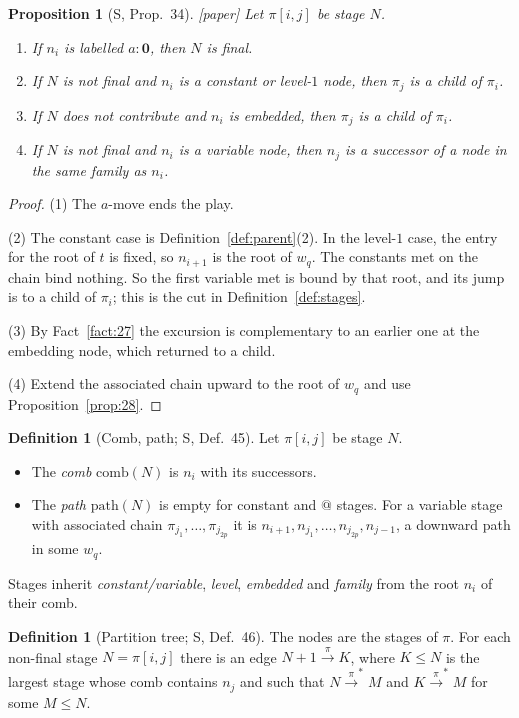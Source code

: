 \documentclass[11pt]{article}
\newcommand{\Ground}{\mathbf{0}}
\newcommand{\iv}[2]{\pi[#1,#2]}
\newcommand{\comb}{\mathrm{comb}}
\newcommand{\pth}{\mathrm{path}}
\newcommand{\ra}[1]{\xrightarrow{#1}}
\newcommand{\Paper}{\textsf{[paper]}}
\theoremstyle{plain}
\newtheorem{proposition}[theorem]{Proposition}
\theoremstyle{definition}
\newtheorem{definition}[theorem]{Definition}
\theoremstyle{remark}
\begin{document}
\begin{proposition}[S, Prop.~34]\label{prop:34}
\Paper{} Let $\iv ij$ be stage $N$.
\begin{enumerate}
\item If $n_i$ is labelled $a:\Ground$, then $N$ is final.
\item If $N$ is not final and $n_i$ is a constant or level-$1$ node,
  then $\pi_j$ is a child of $\pi_i$.
\item If $N$ does not contribute and $n_i$ is embedded, then $\pi_j$ is a
  child of $\pi_i$.
\item If $N$ is not final and $n_i$ is a variable node, then $n_j$ is a
  successor of a node in the same family as $n_i$.
\end{enumerate}
\end{proposition}
\begin{proof}
(1) The $a$-move ends the play.

(2) The constant case is Definition~\ref{def:parent}(2).  In the
level-$1$ case, the entry for the root of $t$ is fixed, so $n_{i+1}$ is
the root of $w_q$.  The constants met on the chain bind nothing.  So the
first variable met is bound by that root, and its jump is to a child of
$\pi_i$; this is the cut in Definition~\ref{def:stages}.

(3) By Fact~\ref{fact:27} the excursion is complementary to an earlier
one at the embedding node, which returned to a child.

(4) Extend the associated chain upward to the root of $w_q$ and use
Proposition~\ref{prop:28}.
\end{proof}

\begin{definition}[Comb, path; S, Def.~45]
Let $\iv ij$ be stage $N$.
\begin{itemize}
\item The \emph{comb} $\comb(N)$ is $n_i$ with its successors.
\item The \emph{path} $\pth(N)$ is empty for constant and $@$ stages.
  For a variable stage with associated chain
  $\pi_{j_1},\dots,\pi_{j_{2p}}$ it is
  $n_{i+1},n_{j_1},\dots,n_{j_{2p}},n_{j-1}$, a downward path in some
  $w_q$.
\end{itemize}
Stages inherit \emph{constant/variable}, \emph{level},
\emph{embedded} and \emph{family} from the root $n_i$ of their comb.
\end{definition}

\begin{definition}[Partition tree; S, Def.~46]\label{def:ptree}
The nodes are the stages of $\pi$.  For each non-final stage $N=\iv ij$
there is an edge $N+1\ra\pi K$, where $K\le N$ is the largest stage
whose comb contains $n_j$ and such that $N\ra\pi^*M$ and $K\ra\pi^*M$
for some $M\le N$.
\end{definition}
\end{document}
